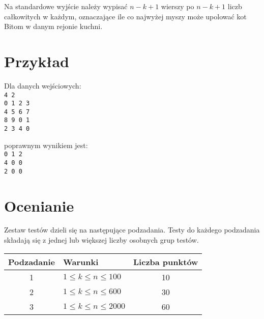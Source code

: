 \documentclass[10pt]{article}
\begin{document}
    Na standardowe wyjście należy wypisać $n-k+1$ wierszy po $n-k+1$ liczb całkowitych w każdym, oznaczające ile co najwyżej myszy może upolować kot Bitom w danym rejonie kuchni.


    \section*{Przykład}
    
    \noindent
    \begin{minipage}[t]{0.5\textwidth}
        Dla danych wejściowych:\vspace{1ex}\\
        \texttt{4 2\\0 1 2 3\\4 5 6 7\\8 9 0 1\\2 3 4 0}
    \end{minipage}
    \begin{minipage}[t]{0.5\textwidth}
        poprawnym wynikiem jest:\vspace{1ex}\\
        \texttt{0 1 2\\4 0 0\\2 0 0}
    \end{minipage}
    
    
    

    \section*{Ocenianie}
        
    Zestaw testów dzieli się na następujące podzadania. Testy do każdego podzadania składają się z jednej lub większej liczby osobnych grup testów.
    
    \begin{center}
        \begin{tabular}{ |c|p{9cm}|c| }
            \hline
            \textbf{Podzadanie} & \textbf{Warunki} & \textbf{Liczba punktów}\\
            \hline
            1 & $1 \leq k \leq n \leq 100$ & 10\\
            \hline
            2 & $1 \leq k \leq n \leq 600$ & 30\\
            \hline
            3 & $1 \leq k \leq n \leq 2000$ & 60\\
            \hline
        \end{tabular}
    \end{center}
\end{document}

